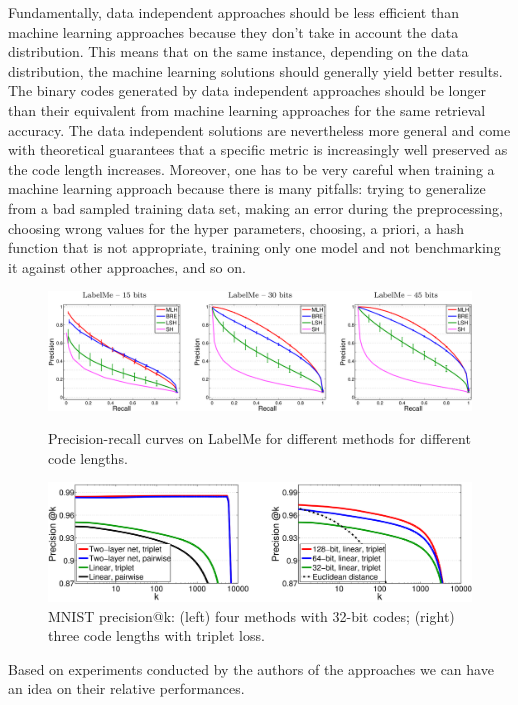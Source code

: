 Fundamentally, data independent approaches should be less efficient than machine learning approaches because they don't take in account the data distribution. This means that on the same instance, depending on the data distribution, the machine learning solutions should generally yield better results. The binary codes generated by data independent approaches should be longer than their equivalent from machine learning approaches for the same retrieval accuracy. The data independent solutions are nevertheless more general and come with theoretical guarantees that a specific metric is increasingly well preserved as the code length increases. Moreover, one has to be very careful when training a machine learning approach because there is many pitfalls: trying to generalize from a bad sampled training data set, making an error during the preprocessing, choosing wrong values for the hyper parameters, choosing, a priori, a hash function that is not appropriate, training only one model and not benchmarking it against other approaches, and so on.

\begin{figure}
	\includegraphics[width=\textwidth]{mlh_labelme.png}
	\caption{Precision-recall curves on LabelMe for different methods for different code lengths. \cite{norouzi2011minimal}}
	\label{fig:mlh_labelme}
	
	\includegraphics[width=\textwidth]{trl_vs_mlh.png}
	\caption{MNIST precision@k: (left) four methods with 32-bit codes; (right) three code lengths with triplet loss. \cite{norouzi2012hamming}}
	\label{fig:trl_vs_mlh}
\end{figure}

Based on experiments conducted by the authors of the approaches we can have an idea on their relative performances.

